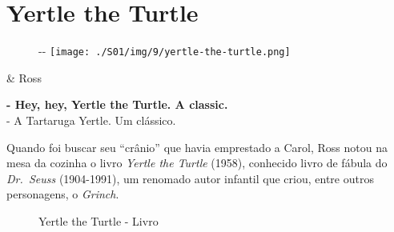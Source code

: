 \hypertarget{yertle-the-turtle}{%
\section{Yertle the Turtle}\label{yertle-the-turtle}}

\begin{figure}[!ht]
  \begin{adjustwidth}{-\oddsidemargin-1in}{-\rightmargin}
    \centering
    \texttt{[image: ./S01/img/9/yertle-the-turtle.png]}
  \end{adjustwidth}
\end{figure}

\begin{tcolorbox}[enhanced,center upper,
    drop fuzzy shadow southeast, boxrule=0.3pt,
    lower separated=false,
    colframe=black!30!dialogoBorder,colback=white]
\begin{minipage}[c]{0.16\linewidth}
   & \centering \scriptsize{Ross}
\end{minipage}
\hfill
\begin{minipage}[c]{0.8\linewidth}
  \textbf{- Hey, hey, Yertle the Turtle. A classic.}\\
  - A Tartaruga Yertle. Um clássico.
\end{minipage}
\end{tcolorbox}

Quando foi buscar seu ``crânio'' que havia emprestado a Carol, Ross
notou na mesa da cozinha o livro \emph{Yertle the Turtle} (1958),
conhecido livro de fábula do \emph{Dr.~Seuss} (1904-1991), um renomado
autor infantil que criou, entre outros personagens, o \emph{Grinch}.

\begin{figure}
  \centering
    \caption{Yertle the Turtle - Livro\label{fig:yertle-the-turtle-livro}}
\end{figure}

